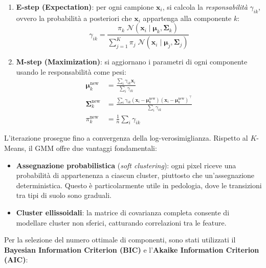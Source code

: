 \documentclass[a4paper,12pt]{article}
\newcommand{\kmeans}{$K$\nobreakdash-Means}
\begin{document}
\begin{enumerate}
    \item \textbf{E-step (Expectation)}: per ogni campione $\mathbf{x}_i$,
    si calcola la \emph{responsabilità} $\gamma_{ik}$, ovvero la
    probabilità a posteriori che $\mathbf{x}_i$ appartenga alla componente
    $k$:
    \begin{equation}
        \gamma_{ik} = \frac{\pi_k \;\mathcal{N}(\mathbf{x}_i \mid
        \boldsymbol{\mu}_k, \boldsymbol{\Sigma}_k)}
        {\sum_{j=1}^{K} \pi_j \;\mathcal{N}(\mathbf{x}_i \mid
        \boldsymbol{\mu}_j, \boldsymbol{\Sigma}_j)}
    \end{equation}

    \item \textbf{M-step (Maximization)}: si aggiornano i parametri di
    ogni componente usando le responsabilità come pesi:
    \begin{align}
        \boldsymbol{\mu}_k^{\text{new}} &= \frac{\sum_i \gamma_{ik}
        \mathbf{x}_i}{\sum_i \gamma_{ik}} \\
        \boldsymbol{\Sigma}_k^{\text{new}} &= \frac{\sum_i \gamma_{ik}
        (\mathbf{x}_i - \boldsymbol{\mu}_k^{\text{new}})
        (\mathbf{x}_i - \boldsymbol{\mu}_k^{\text{new}})^\top}
        {\sum_i \gamma_{ik}} \\
        \pi_k^{\text{new}} &= \frac{1}{n} \sum_i \gamma_{ik}
    \end{align}
\end{enumerate}

L'iterazione prosegue fino a convergenza della log-verosimiglianza.
Rispetto al \kmeans{}, il GMM offre due vantaggi fondamentali:

\begin{itemize}
    \item \textbf{Assegnazione probabilistica} (\emph{soft clustering}):
    ogni pixel riceve una probabilità di appartenenza a ciascun cluster,
    piuttosto che un'assegnazione deterministica. Questo è
    particolarmente utile in pedologia, dove le transizioni tra tipi di
    suolo sono graduali.

    \item \textbf{Cluster ellissoidali}: la matrice di covarianza
    completa consente di modellare cluster non sferici, catturando
    correlazioni tra le feature.
\end{itemize}

Per la selezione del numero ottimale di componenti, sono stati utilizzati
il \textbf{Bayesian Information Criterion (BIC)} e l'\textbf{Akaike
Information Criterion (AIC)}:
\end{document}
